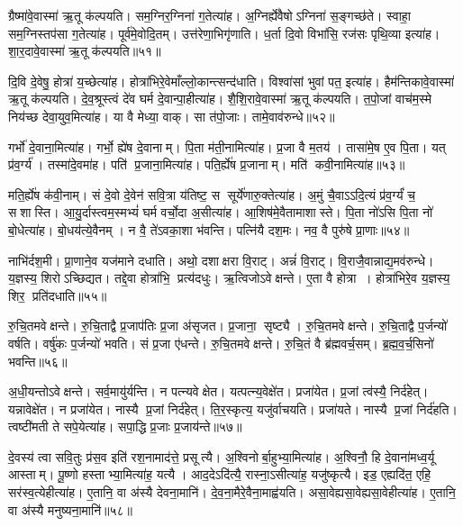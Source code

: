 ग्रैष्मा॑वे॒वास्मा॑ ऋ॒तू क॑ल्पयति। 
सम॒ग्निर॒ग्निना॑ ग॒तेत्या॑ह। 
अ॒ग्निर्ह्ये॑वैषोऽग्निना॑ स॒ङ्गच्छ॑ते। 
स्वाहा॒ सम॒ग्निस्तप॑सा ग॒तेत्या॑ह। 
पूर्व॑मे॒वोदि॒तम्। 
उत्त॑रेणा॒भिगृ॑णाति। 
ध॒र्ता दि॒वो विभा॑सि॒ रज॑सः पृथि॒व्या इत्या॑ह। 
शा॒र॒दावे॒वास्मा॑ ऋ॒तू क॑ल्पयति॥५१॥

दि॒वि दे॒वेषु॒ होत्रा॑ य॒च्छेत्या॑ह। 
होत्रा॑भिरे॒वेमाँल्लो॒कान्त्सन्द॑\-धाति। 
विश्वा॑सां भुवां पत॒ इत्या॑ह। 
हैम॑न्तिकावे॒वास्मा॑ ऋ॒तू क॑ल्पयति। 
दे॒व॒श्रूस्त्वं दे॑व घर्म दे॒वान्पा॒हीत्या॑ह। 
शै॒शि॒रावे॒वास्मा॑ ऋ॒तू क॑ल्पयति। 
त॒पो॒जां वाच॑म॒स्मे निय॑च्छ देवा॒युव॒मित्या॑ह। 
या वै मेध्या॒ वाक्। 
सा त॑पो॒जाः। 
तामे॒वाव॑रुन्धे॥५२॥

गर्भो॑ दे॒वाना॒मित्या॑ह। 
गर्भो॒ ह्ये॑ष दे॒वानाम्। 
पि॒ता म॑ती॒नामित्या॑ह। 
प्र॒जा वै म॒तय॑। 
तासा॑मे॒ष ए॒व पि॒ता। 
यत् प्र॑व॒र्ग्य॑। 
तस्मा॑दे॒वमा॑ह। 
पति॑ प्र॒जाना॒मित्या॑ह। 
पति॒र्ह्ये॑ष प्र॒जानाम्। 
मति॑ कवी॒नामित्या॑ह॥५३॥

मति॒र्ह्ये॑ष क॑वी॒नाम्। 
सं दे॒वो दे॒वेन॑ सवि॒त्रा य॑तिष्ट॒ स सूर्ये॑णारु॒क्तेत्या॑ह। 
अ॒मुं चै॒वाऽऽदि॒त्यं प्र॑व॒र्ग्यं॑ च॒ सशास्ति। 
आ॒यु॒र्दास्त्वम॒स्मभ्यं॑ घर्म वर्चो॒दा अ॒सीत्या॑ह। 
आ॒शिष॑मे॒वैतामाशास्ते। 
पि॒ता नो॑ऽसि पि॒ता नो॑ बो॒धेत्या॑ह। 
बो॒धय॑त्ये॒वैनम्। 
न वै॒ ते॑ऽवका॒शा भ॑वन्ति। 
पत्नि॑यै दश॒मः। 
नव॒ वै पुरु॑षे प्रा॒णाः॥५४॥

नाभि॑र्दश॒मी। 
प्रा॒णाने॒व यज॑माने दधाति। 
अथो॒ दशाक्षरा वि॒राट्। 
अन्नं॑  वि॒राट्। 
वि॒राजै॒वान्नाद्य॒मव॑रुन्धे। 
य॒ज्ञस्य॒ शिरोऽच्छिद्यत। 
तद्दे॒वा होत्रा॑भि॒ प्रत्य॑दधुः। 
ऋ॒त्विजोऽवेक्षन्ते। 
ए॒ता वै होत्रा। 
होत्रा॑भिरे॒व य॒ज्ञस्य॒ शिर॒ प्रति॑दधाति॥५५॥

रु॒चि॒तमवेक्षन्ते। 
रु॒चि॒ताद्वै प्र॒जाप॑तिः प्र॒जा अ॑सृजत। 
प्र॒जाना॒ सृष्ट्यै। 
रु॒चि॒तमवेक्षन्ते। 
रु॒चि॒ताद्वै प॒र्जन्यो॑ वर्\mbox{}षति। 
वर्\mbox{}षु॑कः प॒र्जन्यो॑ भवति। 
सं प्र॒जा ए॑धन्ते। 
रु॒चि॒तमवेक्षन्ते। 
रु॒चि॒तं वै ब्र॑ह्मवर्च॒सम्। 
ब्र॒ह्म॒व॒र्च॒सिनो॑ भवन्ति॥५६॥

अ॒धी॒यन्तोऽवेक्षन्ते। 
सर्व॒मायु॑र्\mbox{}यन्ति। 
न पत्न्यवेक्षेत। 
यत्पत्न्य॒वेक्षे॑त। 
प्रजा॑येत। 
प्र॒जां त्व॑स्यै॒ निर्द॑हेत्। 
यन्नावेक्षे॑त। 
न प्रजा॑येत। 
नास्यै प्र॒जां निर्द॑हेत्। 
ति॒र॒स्कृत्य॒ यजु॑र्वाचयति। 
प्रजा॑यते। 
नास्यै प्र॒जां निर्द॑हति। 
त्वष्टी॑मती ते सपे॒येत्या॑ह। 
सपा॒द्धि प्र॒जाः प्र॒जाय॑न्ते॥५७॥

दे॒वस्य॑ त्वा सवि॒तुः प्र॑स॒व इति॑ रश॒नामाद॑त्ते॒ प्रसूत्यै। 
अ॒श्विनोर्बा॒हुभ्या॒मित्या॑ह। 
अ॒श्विनौ॒ हि दे॒वाना॑मध्व॒र्यू आस्ताम्। 
पू॒ष्णो हस्ताभ्या॒मित्या॑ह॒ यत्यै। 
आद॒देऽदि॑त्यै॒ रास्ना॒ऽसीत्या॑ह॒ यजु॑ष्कृत्यै। 
इड॒ एह्यदि॑त॒ एहि॒ सर॑स्व॒त्येहीत्या॑ह। 
ए॒तानि॒ वा अ॑स्यै देवना॒मानि॑। 
दे॒व॒ना॒मैरे॒वैना॒माह्व॑यति। 
असा॒वेह्यसा॒वेह्यसा॒वेहीत्या॑ह। 
ए॒तानि॒ वा अ॑स्यै मनुष्यना॒मानि॑॥५८॥

